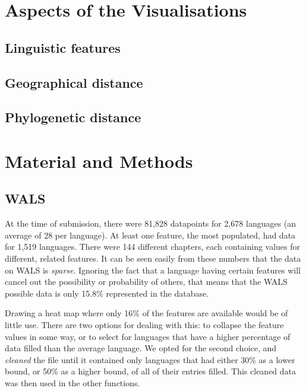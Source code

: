 \documentclass[11pt]{article}
\begin{document}
\section{Aspects of the Visualisations}

\subsection{Linguistic features}
\subsection{Geographical distance}
\subsection{Phylogenetic distance}


\section{Material and Methods}
\subsection{WALS}
At the time of submission, there were 81,828 datapoints for 2,678 languages (an average of 28 per language). At least one feature, the most populated, had data for 1,519 languages. There were 144 different chapters, each containing values for different, related features. It can be seen easily from these numbers that the data on WALS is \emph{sparse}. Ignoring the fact that a language having certain features will cancel out the possibility or probability of others, that means that the WALS possible data is only 15.8\% represented in the database.

Drawing a heat map where only 16\% of the features are available would be of little use. There are two options for dealing with this: to collapse the feature values in some way, or to select for languages that have a higher percentage of data filled than the average language. We opted for the second choice, and \emph{cleaned}  the file until it contained only languages that had either 30\% as a lower bound, or 50\% as a higher bound, of all of their entries filled. This cleaned data was then used in the other functions.  

	
\end{document}
